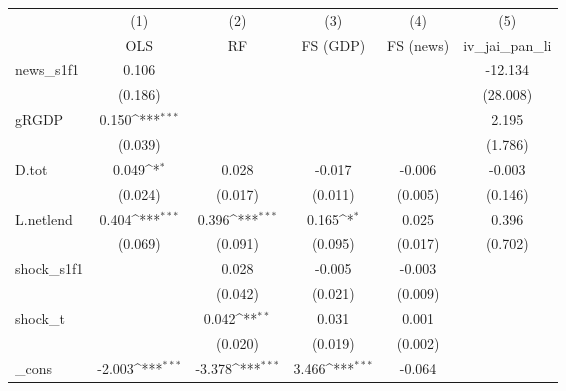 {
\def\sym#1{\ifmmode^{#1}\else\(^{#1}\)\fi}
\begin{tabular}{l*{5}{c}}
\toprule
            &\multicolumn{1}{c}{(1)}&\multicolumn{1}{c}{(2)}&\multicolumn{1}{c}{(3)}&\multicolumn{1}{c}{(4)}&\multicolumn{1}{c}{(5)}\\
            &\multicolumn{1}{c}{OLS}&\multicolumn{1}{c}{RF}&\multicolumn{1}{c}{FS (GDP)}&\multicolumn{1}{c}{FS (news)}&\multicolumn{1}{c}{iv\_jai\_pan\_li}\\
\midrule
news\_s1f1   &       0.106         &                     &                     &                     &     -12.134         \\
            &     (0.186)         &                     &                     &                     &    (28.008)         \\
\addlinespace
gRGDP       &       0.150\sym{***}&                     &                     &                     &       2.195         \\
            &     (0.039)         &                     &                     &                     &     (1.786)         \\
\addlinespace
D.tot       &       0.049\sym{*}  &       0.028         &      -0.017         &      -0.006         &      -0.003         \\
            &     (0.024)         &     (0.017)         &     (0.011)         &     (0.005)         &     (0.146)         \\
\addlinespace
L.netlend   &       0.404\sym{***}&       0.396\sym{***}&       0.165\sym{*}  &       0.025         &       0.396         \\
            &     (0.069)         &     (0.091)         &     (0.095)         &     (0.017)         &     (0.702)         \\
\addlinespace
shock\_s1f1  &                     &       0.028         &      -0.005         &      -0.003         &                     \\
            &                     &     (0.042)         &     (0.021)         &     (0.009)         &                     \\
\addlinespace
shock\_t     &                     &       0.042\sym{**} &       0.031         &       0.001         &                     \\
            &                     &     (0.020)         &     (0.019)         &     (0.002)         &                     \\
\addlinespace
\_cons      &      -2.003\sym{***}&      -3.378\sym{***}&       3.466\sym{***}&      -0.064         &                     \\

\end{tabular}}
